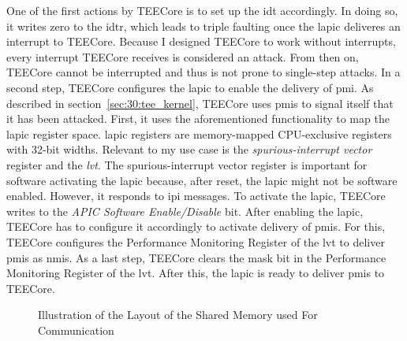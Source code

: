 One of the first actions by TEECore is to set up the \gls{idt} accordingly. In
doing so, it writes zero to the \gls{idtr}, which leads to triple faulting once
the \gls{lapic} deliveres an interrupt to TEECore. Because I designed TEECore to
work without interrupts, every interrupt TEECore receives is considered an
attack. From then on, TEECore cannot be interrupted and thus is not prone to
single-step attacks. In a second step, TEECore configures the \gls{lapic} to
enable the delivery of \gls{pmi}. As described in
section~\ref{sec:30:tee_kernel}, TEECore uses \glspl{pmi} to signal itself that
it has been attacked. First, it uses the aforementioned functionality to map the
\gls{lapic} register space. \gls{lapic} registers are memory-mapped
CPU-exclusive registers with 32-bit widths. Relevant to my use case is the
\textit{spurious-interrupt vector} register and the \textit{\gls{lvt}}. The
spurious-interrupt vector register is important for software activating the
\gls{lapic} because, after reset, the \gls{lapic} might not be software enabled.
However, it responds to \gls{ipi} messages. To activate the \gls{lapic}, TEECore
writes to the \textit{APIC Software Enable/Disable} bit. After enabling the
\gls{lapic}, TEECore has to configure it accordingly to activate delivery of
\glspl{pmi}. For this, TEECore configures the Performance Monitoring Register of
the \gls{lvt} to deliver \glspl{pmi} as \glspl{nmi}. As a last step, TEECore
clears the mask bit in the Performance Monitoring Register of the \gls{lvt}.
After this, the \gls{lapic} is ready to deliver \glspl{pmi} to TEECore.\\

\begin{center}
  \begin{figure}
    \centering
    
    \caption{Illustration of the Layout of the Shared Memory used For Communication}
    \label{fig:impl:shared_mem_layout}
  \end{figure}
\end{center}

